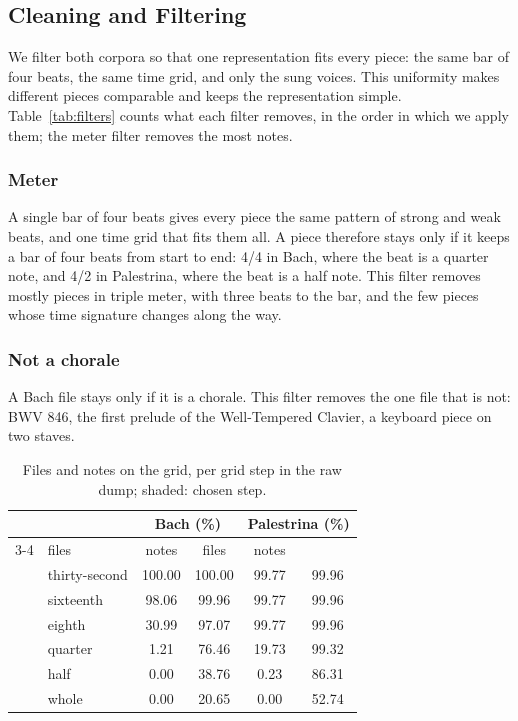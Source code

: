 \subsection{Cleaning and Filtering}

We filter both corpora so that one representation fits every piece: the same bar of four beats, the same time grid, and only the sung voices. This uniformity makes different pieces comparable and keeps the representation simple. Table~\ref{tab:filters} counts what each filter removes, in the order in which we apply them; the meter filter removes the most notes.

\subsubsection{Meter}
A single bar of four beats gives every piece the same pattern of strong and weak beats, and one time grid that fits them all. A piece therefore stays only if it keeps a bar of four beats from start to end: 4/4 in Bach, where the beat is a quarter note, and 4/2 in Palestrina, where the beat is a half note. This filter removes mostly pieces in triple meter, with three beats to the bar, and the few pieces whose time signature changes along the way.

\subsubsection{Not a chorale}
A Bach file stays only if it is a chorale. This filter removes the one file that is not: BWV 846, the first prelude of the Well-Tempered Clavier, a keyboard piece on two staves.

\begin{table}[t]
\renewcommand{\arraystretch}{1.3}
\centering
\caption{Files and notes on the grid, per grid step in the raw dump; shaded: chosen step.}
\label{tab:grid}
\begin{tabular}{@{}clcccc}  %
\hline
& & \multicolumn{2}{c}{Bach (\%)} & \multicolumn{2}{c}{Palestrina (\%)} \\
\cline{3-4} \cline{5-6}
\multicolumn{2}{@{}l}{Grid step} & files & notes & files & notes \\
\hline
\smash{\raisebox{-0.3ex}{\scalebox{0.72}{\Zwdr}}} & thirty-second & 100.00 & 100.00 & 99.77 & 99.96 \\
\smash{\raisebox{-0.3ex}{\scalebox{0.72}{\Sech}}} & sixteenth & \cellcolor{gray!18}98.06 & \cellcolor{gray!18}99.96 & 99.77 & 99.96 \\
\smash{\raisebox{-0.3ex}{\scalebox{0.72}{\Acht}}} & eighth & 30.99 & 97.07 & \cellcolor{gray!18}99.77 & \cellcolor{gray!18}99.96 \\
\smash{\raisebox{-0.3ex}{\scalebox{0.72}{\Vier}}} & quarter & 1.21 & 76.46 & 19.73 & 99.32 \\
\smash{\raisebox{-0.3ex}{\scalebox{0.72}{\Halb}}} & half & 0.00 & 38.76 & 0.23 & 86.31 \\
\smash{\raisebox{0.3ex}{\scalebox{0.72}{\Ganz}}} & whole & 0.00 & 20.65 & 0.00 & 52.74 \\
\hline
\end{tabular}
\end{table}

